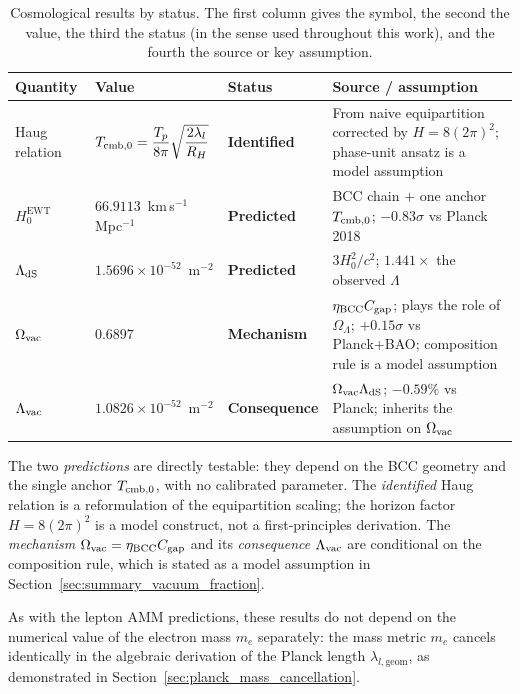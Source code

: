 \documentclass[10pt,a4paper]{article}
\begin{document}
\begin{table}[H]
	\centering
	\small
	\caption{Cosmological results by status. The first column gives the
		symbol, the second the value, the third the status (in the
		sense used throughout this work), and the fourth the source
		or key assumption.}
	\label{tab:cosmo_predictions}
	\begin{tabularx}{\textwidth}{@{}l l l X@{}}
		\toprule
		\textbf{Quantity} & \textbf{Value} & \textbf{Status} & \textbf{Source / assumption} \\
		\midrule
		Haug relation
		& $T_{\rm cmb,0} = \dfrac{T_p}{8\pi}\sqrt{\dfrac{2\lambda_l}{R_H}}$
		& \textbf{Identified}
		& From naive equipartition corrected by $H = 8(2\pi)^2$; phase-unit ansatz is a model assumption \\
		$H_0^{\text{EWT}}$
		& $66.9113$~km\,s$^{-1}$\,Mpc$^{-1}$
		& \textbf{Predicted}
		& BCC chain $+$ one anchor $T_{\rm cmb,0}$; $-0.83\sigma$ vs Planck 2018 \\
		$\Lambda_{\rm dS}$
		& $1.5696\times 10^{-52}$~m$^{-2}$
		& \textbf{Predicted}
		& $3H_0^2/c^2$; $1.441\times$ the observed $\Lambda$ \\
		$\Omega_{\rm vac}$
		& $0.6897$
		& \textbf{Mechanism}
		& $\eta_{\rm BCC} C_{\rm gap}$; plays the role of $\Omega_\Lambda$; $+0.15\sigma$ vs Planck+BAO; composition rule is a model assumption \\
		$\Lambda_{\rm vac}$
		& $1.0826\times 10^{-52}$~m$^{-2}$
		& \textbf{Consequence}
		& $\Omega_{\rm vac}\Lambda_{\rm dS}$; $-0.59\%$ vs Planck; inherits the assumption on $\Omega_{\rm vac}$ \\
		\bottomrule
	\end{tabularx}
\end{table}

The two \emph{predictions} are directly testable: they depend on the
BCC geometry and the single anchor \(T_{\rm cmb,0}\), with no
calibrated parameter. The \emph{identified} Haug relation is a
reformulation of the equipartition scaling; the horizon factor
\(H = 8(2\pi)^2\) is a model construct, not a first-principles
derivation. The \emph{mechanism} $\Omega_{\rm vac} = \eta_{\rm
	BCC}C_{\rm gap}$ and its \emph{consequence} $\Lambda_{\rm vac}$ are
conditional on the composition rule, which is stated as a model
assumption in Section~\ref{sec:summary_vacuum_fraction}.

As with the lepton AMM predictions, these results do not depend on the numerical value of the electron mass \(m_e\) separately: the mass metric \(m_e\) cancels identically in the algebraic derivation of the Planck length \(\lambda_{l,\text{geom}}\), as demonstrated in Section~\ref{sec:planck_mass_cancellation}. 
\end{document}
